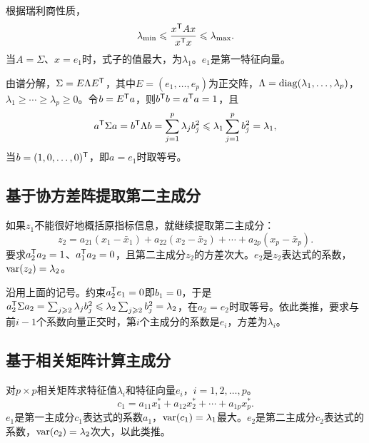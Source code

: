 根据瑞利商性质，
\begin{equation}
\lambda_{\min}\leqslant\frac{x^{\mathsf T} Ax}{x^{\mathsf T} x}\leqslant\lambda_{\max}.
\end{equation}
当$A=\Sigma$、$x=e_1$时，式子的值最大，为$\lambda_1$。$e_1$是第一特征向量。
\begin{zm}
由谱分解，$\Sigma=E\Lambda E^{\mathsf T}$，其中$E=(e_1,\ldots,e_p)$为正交阵，$\Lambda=\operatorname{diag}(\lambda_1,\ldots,\lambda_p)$，$\lambda_1\geqslant\cdots\geqslant\lambda_p\geqslant0$。令$b=E^{\mathsf T} a$，则$b^{\mathsf T} b=a^{\mathsf T} a=1$，且
\[
a^{\mathsf T}\Sigma a=b^{\mathsf T}\Lambda b=\sum_{j=1}^p\lambda_jb_j^2\leqslant\lambda_1\sum_{j=1}^pb_j^2=\lambda_1,
\]
当$b=(1,0,\ldots,0)^{\mathsf T}$，即$a=e_1$时取等号。
\end{zm}
\subsection{基于协方差阵提取第二主成分}
如果$z_1$不能很好地概括原指标信息，就继续提取第二主成分：
\[
z_2=a_{21}(x_1-\bar x_1)+a_{22}(x_2-\bar x_2)+\cdots+a_{2p}(x_p-\bar x_p).
\]
要求$a_2^{\mathsf T} a_2=1$、$a_1^{\mathsf T} a_2=0$，且第二主成分$z_2$的方差次大。$e_2$是$z_2$表达式的系数，$\operatorname{var}(z_2)=\lambda_2$。
\begin{zm}
沿用上面的记号。约束$a_2^{\mathsf T} e_1=0$即$b_1=0$，于是$a_2^{\mathsf T}\Sigma a_2=\sum_{j\geqslant2}\lambda_jb_j^2\leqslant\lambda_2\sum_{j\geqslant2}b_j^2=\lambda_2$，在$a_2=e_2$时取等号。依此类推，要求与前$i-1$个系数向量正交时，第$i$个主成分的系数是$e_i$，方差为$\lambda_i$。
\end{zm}
\subsection{基于相关矩阵计算主成分}
对$p\times p$相关矩阵求特征值$\lambda_i$和特征向量$e_i$，$i=1,2,\ldots,p$。
\[
c_1=a_{11}x_1^*+a_{12}x_2^*+\cdots+a_{1p}x_p^*.
\]
$e_1$是第一主成分$c_1$表达式的系数$a_1$，$\operatorname{var}(c_1)=\lambda_1$最大。$e_2$是第二主成分$c_2$表达式的系数，$\operatorname{var}(c_2)=\lambda_2$次大，以此类推。

